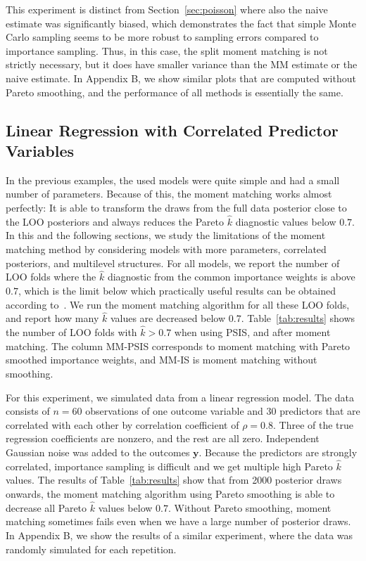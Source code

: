 \documentclass[12pt]{article}
\begin{document}
This experiment is distinct from Section~\ref{sec:poisson} where
also the naive estimate was significantly biased, which demonstrates the
fact that simple Monte Carlo sampling seems to be more robust to sampling errors
compared to importance sampling.
Thus, in this case, the split moment matching is not strictly necessary, but it does
have smaller variance than the MM estimate or the naive estimate.
In Appendix B, we show similar plots that are computed without Pareto smoothing,
and the performance of all methods is essentially the same.








\subsection{Linear Regression with Correlated Predictor Variables} \label{sec:linreg}



In the previous examples, the used models were quite simple and had a small 
number of parameters. Because of this, the moment matching works almost 
perfectly: It is able to transform the
draws from the full data posterior close to the LOO posteriors and always
reduces the Pareto $\hat{k}$ diagnostic values below $0.7$.
In this and the following sections, we study the limitations of the
moment matching method by considering models with more parameters, correlated
posteriors, and multilevel structures.
For all models, we report the number of LOO folds where
the $\hat{k}$ diagnostic from the common importance weights is above $0.7$, which
is the limit below which practically useful results can be obtained according to~\citet{vehtari2017practical}.
We run the moment matching algorithm for all these LOO folds, and report
how many $\hat{k}$ values are decreased below $0.7$.
Table~\ref{tab:results} shows the number of LOO folds with $\hat{k} > 0.7$
when using PSIS, and after moment matching. The column MM-PSIS corresponds to
moment matching with Pareto smoothed importance weights, and MM-IS
is moment matching without smoothing.



For this experiment,
we simulated data from a linear regression model. 
The data consists of $n = 60$ observations of one outcome variable 
and $30$ predictors that are correlated with each other by correlation coefficient
of $\rho = 0.8$. Three of the true regression coefficients are nonzero, and the rest are all zero. Independent Gaussian noise was added to the outcomes $\mathbf{y}$.
Because the predictors are strongly correlated, importance sampling is
difficult and we get multiple high Pareto $\hat{k}$ values.
%
%
%
%
The results of Table~\ref{tab:results} show that
from 2000 posterior draws onwards, the moment matching algorithm using Pareto smoothing
is able to decrease all Pareto $\hat{k}$ values below $0.7$.
Without Pareto smoothing, moment matching sometimes fails even when
we have a large number of posterior draws.
In Appendix B, we show the results of a similar experiment, where
the data was randomly simulated for each repetition.
\end{document}

